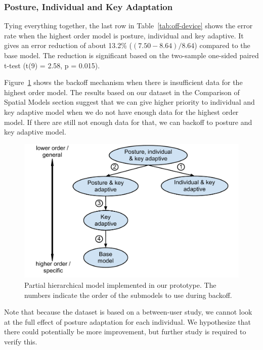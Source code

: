 \documentclass{sigchi}
\begin{document}
\subsubsection{Posture, Individual and Key Adaptation}
Tying everything together, the last row in Table~\ref{tab:off-device} shows the 
error rate when the highest order model is posture, individual and key adaptive.
It gives an error reduction of about 13.2\% ($(7.50 - 8.64) / 8.64$) compared
to the base model. The reduction is significant based on
the two-sample one-sided paired t-test (t(9) = 2.58, p = 0.015).

Figure~\ref{fig:partial-hierarchy} shows the backoff mechanism when there is insufficient data for the highest order model. The results based on our dataset in the Comparison of Spatial Models section suggest that we
can give higher priority to individual and key adaptive model when we do not have enough data for
the highest order model. If there are still not enough data for that, we 
can backoff to posture and key adaptive model. 

\begin{figure}
  \centering
  \includegraphics[width=0.9\columnwidth]{figures/partial-hierarchy.pdf}
  \caption{Partial hierarchical model implemented in our prototype. The numbers indicate the order of the 
submodels to use during backoff.}
  \label{fig:partial-hierarchy}
\end{figure}
Note that because the dataset is based on a between-user study, we cannot look
at the full effect of posture adaptation for each individual. We hypothesize that there could potentially be more improvement, but further study is required to verify this.
\end{document}
